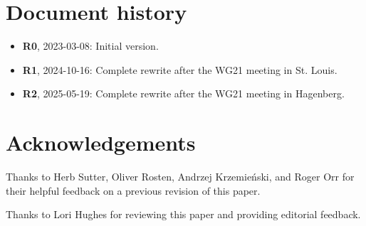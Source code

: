 \pagebreak


\section*{Document history}
\begin{itemize}
\item \textbf{R0}, 2023-03-08: Initial version.
\item \textbf{R1}, 2024-10-16: Complete rewrite after the WG21 meeting in St. Louis.
\item \textbf{R2}, 2025-05-19: Complete rewrite after the WG21 meeting in Hagenberg.
\end{itemize}

\section*{Acknowledgements}

Thanks to Herb Sutter, Oliver Rosten, Andrzej Krzemie\' nski, and Roger Orr for their helpful feedback on a previous revision of this paper.

Thanks to Lori Hughes for reviewing this paper and providing editorial feedback. 


\renewcommand{\addcontentsline}[3]{}%







